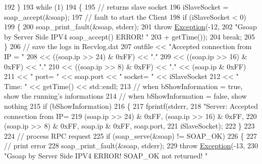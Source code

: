 \begin{DoxyCode}
192             \}
193             \textcolor{keywordflow}{while} (1)
194             \{
195                 \textcolor{comment}{// returns slave socket}
196                 iSlaveSocket = soap\_accept(&soap);
197                 \textcolor{comment}{// fault to start the Client}
198                 \textcolor{keywordflow}{if} (iSlaveSocket < 0)
199                 \{
200                     soap\_print\_fault(&soap, stderr);
201                     \textcolor{keywordflow}{throw} \hyperlink{classException}{Exception}(-12,
202                             \textcolor{stringliteral}{"Gsoap by Server Side IPV4 soap\_accept() ERROR! "}
203                                     + getTime());
204                     \textcolor{keywordflow}{break};
205                 \}
206                 \textcolor{comment}{// save the logs in Recvlog.dat}
207                 outfile << \textcolor{stringliteral}{"Accepted connection from IP = "}
208                         << ((soap.ip >> 24) & 0xFF) << \textcolor{stringliteral}{"."}
209                         << ((soap.ip >> 16) & 0xFF) << \textcolor{stringliteral}{"."}
210                         << ((soap.ip >> 8) & 0xFF) << \textcolor{stringliteral}{"."} << (soap.ip & 0xFF)
211                         << \textcolor{stringliteral}{" port= "} << soap.port << \textcolor{stringliteral}{" socket= "} << iSlaveSocket
212                         << \textcolor{stringliteral}{" Time: "} << getTime() << std::endl;
213                 \textcolor{comment}{// when bShowInformation = true, show the running's informations}
214                 \textcolor{comment}{// when bShowInformation = false, show nothing}
215                 \textcolor{keywordflow}{if} (bShowInformation)
216                 \{
217                     fprintf(stderr,
218                             \textcolor{stringliteral}{"Server: Accepted connection from IP=%
219                             (soap.ip >> 24) & 0xFF, (soap.ip >> 16) & 0xFF,
220                             (soap.ip >> 8) & 0xFF, soap.ip & 0xFF, soap.port,
221                             iSlaveSocket);
222                 \}
223 
224                 \textcolor{comment}{// process RPC request}
225                 \textcolor{keywordflow}{if} (soap\_serve(&soap) != SOAP\_OK)
226                 \{
227                     \textcolor{comment}{// print error}
228                     soap\_print\_fault(&soap, stderr);
229                     \textcolor{keywordflow}{throw} \hyperlink{classException}{Exception}(-13,
230                             \textcolor{stringliteral}{"Gsoap by Server Side IPV4 ERROR! SOAP\_OK not returned! "}
}
\end{DoxyCode}
